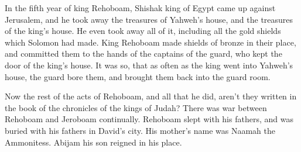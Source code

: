 {In the fifth year of king Rehoboam, Shishak king of Egypt came up against Jerusalem,
and he took away the treasures of Yahweh’s house, and the treasures of the king’s house. He even took away all of it, including all the gold shields which Solomon had made.
King Rehoboam made shields of bronze in their place, and committed them to the hands of the captains of the guard, who kept the door of the king’s house.
It was so, that as often as the king went into Yahweh’s house, the guard bore them, and brought them back into the guard room.
\par }{\PP {}Now the rest of the acts of Rehoboam, and all that he did, aren’t they written in the book of the chronicles of the kings of Judah?
There was war between Rehoboam and Jeroboam continually.
Rehoboam slept with his fathers, and was buried with his fathers in David’s city. His mother’s name was Naamah the Ammonitess. Abijam his son reigned in his place.

}
